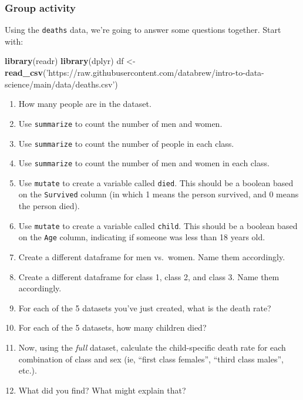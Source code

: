 \documentclass[
]{book}
\newenvironment{Shaded}{\begin{snugshade}}{\end{snugshade}}
\newcommand{\KeywordTok}[1]{\textcolor[rgb]{0.13,0.29,0.53}{\textbf{#1}}}
\newcommand{\NormalTok}[1]{#1}
\newcommand{\StringTok}[1]{\textcolor[rgb]{0.31,0.60,0.02}{#1}}
\begin{document}
\hypertarget{group-activity}{%
\subsubsection*{Group activity}\label{group-activity}}

Using the \texttt{deaths} data, we're going to answer some questions together. Start with:

\begin{Shaded}
\begin{Highlighting}[]
\KeywordTok{library}\NormalTok{(readr)}
\KeywordTok{library}\NormalTok{(dplyr)}
\NormalTok{df <-}\StringTok{ }\KeywordTok{read_csv}\NormalTok{(}\StringTok{'https://raw.githubusercontent.com/databrew/intro-to-data-science/main/data/deaths.csv'}\NormalTok{)}
\end{Highlighting}
\end{Shaded}

\begin{enumerate}
\def\labelenumi{\arabic{enumi}.}
\item
  How many people are in the dataset.
\item
  Use \texttt{summarize} to count the number of men and women.
\item
  Use \texttt{summarize} to count the number of people in each class.
\item
  Use \texttt{summarize} to count the number of men and women in each class.
\item
  Use \texttt{mutate} to create a variable called \texttt{died}. This should be a boolean based on the \texttt{Survived} column (in which 1 means the person survived, and 0 means the person died).
\item
  Use \texttt{mutate} to create a variable called \texttt{child}. This should be a boolean based on the \texttt{Age} column, indicating if someone was less than 18 years old.
\item
  Create a different dataframe for men vs.~women. Name them accordingly.
\item
  Create a different dataframe for class 1, class 2, and class 3. Name them accordingly.
\item
  For each of the 5 datasets you've just created, what is the death rate?
\item
  For each of the 5 datasets, how many children died?
\item
  Now, using the \emph{full} dataset, calculate the child-specific death rate for each combination of class and sex (ie, ``first class females'', ``third class males'', etc.).
\item
  What did you find? What might explain that?
\end{enumerate}
\end{document}

